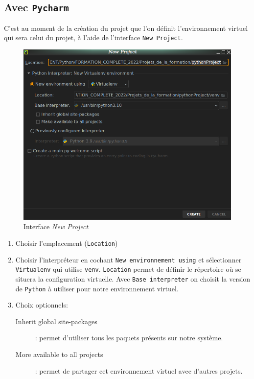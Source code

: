 \documentclass[a4paper,12pt]{book}
\begin{document}
\subsection*{Avec \texttt{Pycharm}}
C'est au moment de la création du projet que l'on définit l'environnement virtuel qui sera celui du projet, à l'aide de l'interface \texttt{New Project}.
\begin{figure}[h]
\begin{center}
\includegraphics[scale=0.4]{IMG/Pycharm-12.png}
\caption{Interface \textit{New Project}}
\end{center}
\end{figure}
\medskip

\begin{enumerate}
	\item Choisir l'emplacement (\texttt{Location})
	\item Choisir l'interpréteur en cochant \texttt{New environnement using} et sélectionner \texttt{Virtualenv} qui utilise \texttt{venv}. \texttt{Location} permet de définir le répertoire où se situera la configuration virtuelle. Avec \texttt{Base interpreter} on choisit la version de \texttt{Python} à utiliser pour notre environnement virtuel.
	\item Choix optionnels:
	\begin{description}
		\item[Inherit global site-packages]: permet d'utiliser tous les paquets présents sur notre système.
		\item[More available to all projects]: permet de partager cet environnement virtuel avec d'autres projets.
	\end{description}
\end{enumerate}
\medskip
\end{document}
